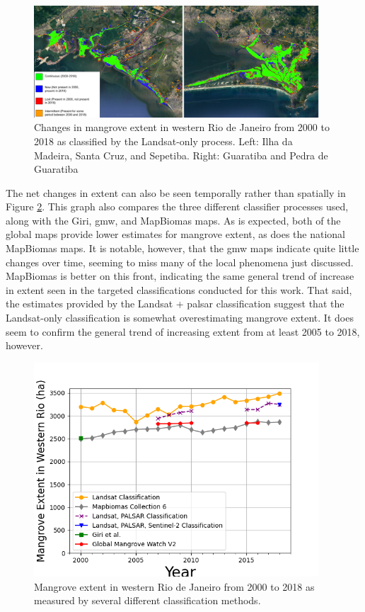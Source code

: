 \begin{figure}[H] 
\centering
\includegraphics[width=0.95\textwidth]{Figures/chap4/extent_changes.png}
\caption[Changes in Mangrove Extent 2000-2018]{Changes in mangrove extent in western Rio de Janeiro from 2000 to 2018 as classified by the Landsat-only process. Left: Ilha da Madeira, Santa Cruz, and Sepetiba. Right: Guaratiba and Pedra de Guaratiba}
\label{fig:extent-changes}
\end{figure}

The net changes in extent can also be seen temporally rather than spatially in Figure \ref{fig:extent-over-time}. This graph also compares the three different classifier processes used, along with the Giri, \ac{gmw}, and MapBiomas maps. As is expected, both of the global maps provide lower estimates for mangrove extent, as does the national MapBiomas maps. It is notable, however, that the \ac{gmw} maps indicate quite little changes over time, seeming to miss many of the local phenomena just discussed. MapBiomas is better on this front, indicating the same general trend of increase in extent seen in the targeted classifications conducted for this work. That said, the estimates provided by the Landsat + \ac{palsar} classification suggest that the Landsat-only classification is somewhat overestimating mangrove extent. It does seem to confirm the general trend of  increasing extent from at least 2005 to 2018, however.  

\begin{figure}[!htb] 
\centering
\includegraphics[width=0.95\textwidth]{Figures/chap4/extent_over_time.png}
\caption[Mangrove Extent Over Time]{Mangrove extent in western Rio de Janeiro from 2000 to 2018 as measured by several different classification methods.}
\label{fig:extent-over-time}
\end{figure}

